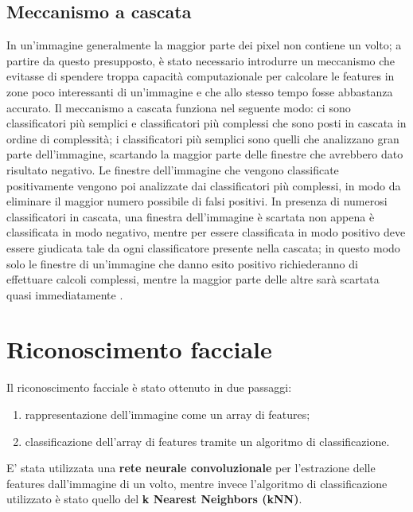 \subsection{Meccanismo a cascata}
In un'immagine generalmente la maggior parte dei pixel non contiene un volto; a partire da questo presupposto, è stato necessario introdurre un meccanismo che evitasse di spendere troppa capacità computazionale per calcolare le features in zone poco interessanti di un'immagine e che allo stesso tempo fosse abbastanza accurato. Il meccanismo a cascata funziona nel seguente modo: ci sono classificatori più semplici e classificatori più complessi che sono posti in cascata in ordine di complessità; i classificatori più semplici sono quelli che analizzano gran parte dell'immagine, scartando la maggior parte delle finestre che avrebbero dato risultato negativo. Le finestre dell'immagine che vengono classificate positivamente vengono poi analizzate dai classificatori più complessi, in modo da eliminare il maggior numero possibile di falsi positivi. In presenza di numerosi classificatori in cascata, una finestra dell'immagine è scartata non appena è classificata in modo negativo, mentre per essere classificata in modo positivo deve essere giudicata tale da ogni classificatore presente nella cascata; in questo modo solo le finestre di un'immagine che danno esito positivo richiederanno di effettuare calcoli complessi, mentre la maggior parte delle altre sarà scartata quasi immediatamente \cite{viola2001rapid}.

\section{Riconoscimento facciale}
Il riconoscimento facciale è stato ottenuto in due passaggi:
\begin{enumerate}
	\item rappresentazione dell'immagine come un array di features;
	\item classificazione dell'array di features tramite un algoritmo di classificazione.
\end{enumerate}
E' stata utilizzata una \textbf{rete neurale convoluzionale} per l'estrazione delle features dall'immagine di un volto, mentre invece l'algoritmo di classificazione utilizzato è stato quello del \textbf{k Nearest Neighbors (kNN)}. 

